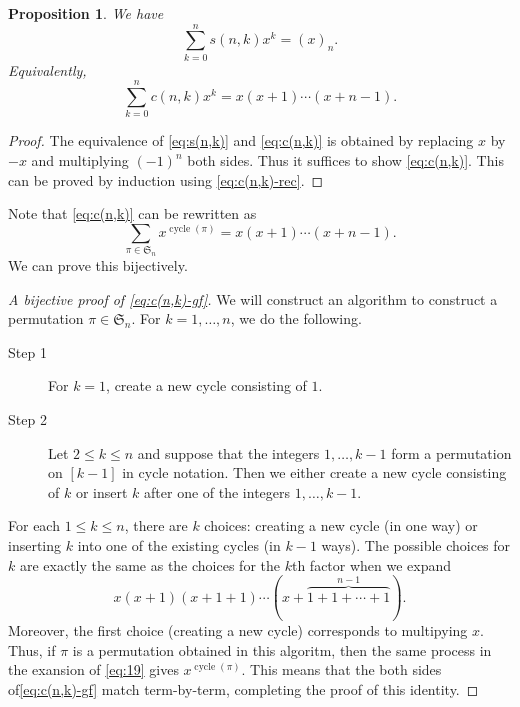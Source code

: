 \documentclass[oneside]{book}
\numberwithin{equation}{section}
\newtheorem{prop}[thm]{Proposition}
\theoremstyle{definition}
\newcommand\cycle{\operatorname{cycle}}
\newcommand\sym{\mathfrak{S}}
\begin{document}
\begin{prop}
  We have
  \begin{equation}\label{eq:s(n,k)}
    \sum_{k=0}^{n} s(n,k) x^k = (x)_n.
  \end{equation}
  Equivalently,
  \begin{equation}\label{eq:c(n,k)}
    \sum_{k=0}^{n} c(n,k) x^k = x(x+1) \cdots (x+n-1).
  \end{equation}
\end{prop}

\begin{proof}
  The equivalence of \eqref{eq:s(n,k)} and \eqref{eq:c(n,k)} is
  obtained by replacing \( x \) by \( -x \) and multiplying
  \( (-1)^{n} \) both sides.
  Thus it suffices to show \eqref{eq:c(n,k)}.
  This can be proved by induction using \eqref{eq:c(n,k)-rec}.
\end{proof}

Note that \eqref{eq:c(n,k)} can be rewritten as
\begin{equation}\label{eq:c(n,k)-gf}
   \sum_{\pi\in \sym_n}  x^{\cycle(\pi)} = x(x+1) \cdots (x+n-1).
\end{equation}
We can prove this bijectively.

\begin{proof}[A bijective proof of \eqref{eq:c(n,k)-gf}]
  We will construct an algorithm to construct a permutation
  \( \pi\in \sym_n \).
  For \( k=1,\dots,n \), we do the following.
  \begin{description}
  \item[Step 1] For \( k=1 \), create a new cycle consisting of \( 1 \).
  \item[Step 2] Let \( 2\le k\le n \) and suppose that the integers
    \( 1,\dots,k-1 \) form a permutation on \( [k-1] \) in cycle
    notation. Then we either create a new cycle consisting of \( k \)
    or insert \( k \) after one of the integers \( 1,\dots,k-1 \).
  \end{description}

  For each \( 1\le k\le n \), there are \( k \) choices: creating a
  new cycle (in one way) or inserting \( k \) into one of the existing
  cycles (in \( k-1 \) ways). The possible choices for \( k \) are
  exactly the same as the choices for the \( k \)th factor when we
  expand
  \begin{equation}\label{eq:19}
    x(x+1)(x+1+1)\cdots (x+\overbrace{1+1 + \cdots + 1}^{n-1}).
  \end{equation}
  Moreover, the first choice (creating a new cycle) corresponds to
  multipying \( x \). Thus, if \( \pi \) is a permutation obtained in
  this algoritm, then the same process in the exansion of
  \eqref{eq:19} gives \( x^{\cycle(\pi)} \). This means that the both
  sides of\eqref{eq:c(n,k)-gf} match term-by-term, completing the
  proof of this identity.
\end{proof}
\end{document}
